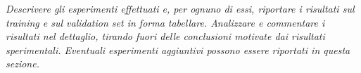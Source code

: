 \emph{Descrivere gli esperimenti effettuati e, per ognuno di essi, riportare i risultati sul training e sul validation set in forma tabellare. Analizzare e commentare i risultati nel dettaglio, tirando fuori delle conclusioni motivate dai risultati sperimentali. Eventuali esperimenti aggiuntivi possono essere riportati in questa sezione.}